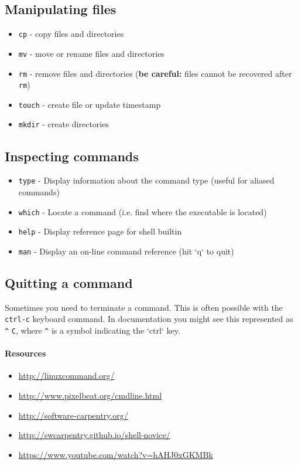 \documentclass[12pt,letterpaper,twoside]{article}
\begin{document}
\subsection{Manipulating files}
\begin{itemize}
\item \texttt{cp} - copy files and directories
\item \texttt{mv} - move or rename files and directories
\item \texttt{rm} - remove files and directories
  (\textbf{be careful:} files cannot be recovered after \texttt{rm})
\item \texttt{touch} - create file or update timestamp
\item \texttt{mkdir} - create directories
\end{itemize}

\subsection{Inspecting commands}

\begin{itemize}
\item \texttt{type} - Display information about the command type (useful for aliased commands)
\item \texttt{which} - Locate a command (i.e. find where the executable is located)
\item \texttt{help} - Display reference page for shell builtin
\item \texttt{man} - Display an on-line command reference (hit `q` to quit)
\end{itemize}

\subsection{Quitting a command}

Sometimes you need to terminate a command.  This is often possible with the
\texttt{ctrl-c} keyboard command.  In documentation you might see this represented as \texttt{\^} \texttt{C}, where \texttt{\^} is a symbol indicating the `ctrl` key.

\paragraph{Resources}

\begin{multicols}{2}
\small
\begin{itemize}
\item \href{http://linuxcommand.org/}{http://linuxcommand.org/}
\item \href{http://www.pixelbeat.org/cmdline.html}{http://www.pixelbeat.org/cmdline.html}
\item \href{http://software-carpentry.org/}{http://software-carpentry.org/}
  \item \href{http://swcarpentry.github.io/shell-novice/}{http://swcarpentry.github.io/shell-novice/}
  \item \href{https://www.youtube.com/watch?v=hAHJ0xGKMBk}{https://www.youtube.com/watch?v=hAHJ0xGKMBk}
\end{itemize}
\end{multicols}
\end{document}
